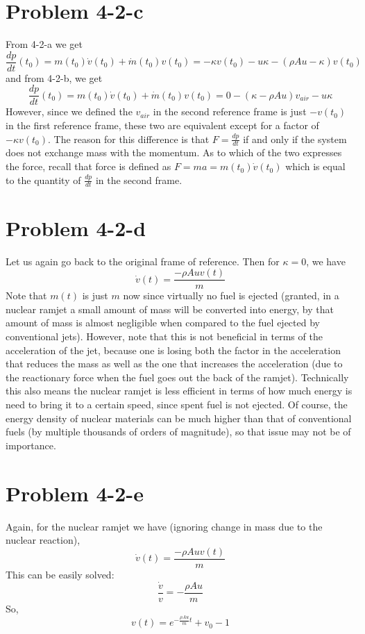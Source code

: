 \section*{Problem 4-2-c}
From 4-2-a we get 
\[ \frac{dp}{dt}(t_0) = m(t_0)\dot{v}(t_0) + \dot{m}(t_0)v(t_0)= -\kappa v(t_0) -u\kappa - (\rho A u -\kappa )v(t_0)\]
and from 4-2-b, we get 
\[ \frac{dp}{dt}(t_0) = m(t_0)\dot{v}(t_0) + \dot{m}(t_0)v(t_0)  = 0 -(\kappa - \rho A u)v_{air} -  u\kappa \]
However, since we defined the $v_{air}$ in the second reference frame is just $-v(t_0)$ in the first reference frame, these two are equivalent except for a factor of $-\kappa v(t_0)$. The reason for this difference is that $F=\frac{dp}{dt}$ if and only if the system does not exchange  mass with the momentum. As to which of the two expresses the force, recall that force is defined as $F=ma=m(t_0)\dot{v}(t_0)$ which is equal to the quantity of $\frac{dp}{dt}$ in the second frame.
\section*{Problem 4-2-d}
Let us again go back to the original frame of reference. Then for $\kappa=0$, we have 
\[ \dot{v}(t) = \frac{-\rho A u v(t)}{m} \]
Note that $m(t)$ is just $m$ now since virtually no fuel is ejected (granted, in a nuclear ramjet a small amount of mass will be converted into energy, by that amount of mass is almost negligible when compared to the fuel ejected by conventional jets). However, note that this is not beneficial in terms of the acceleration of the jet, because one is losing both the factor in the acceleration that reduces the mass as well as the one that increases the acceleration (due to the reactionary force when the fuel goes out the back of the ramjet). Technically this also means the nuclear ramjet is less efficient in terms of how much energy is need to bring it to a certain speed, since spent fuel is not ejected. Of course, the energy density of nuclear materials can be much higher than that of conventional fuels (by multiple thousands of orders of magnitude), so that issue may not be of importance.
\section*{Problem 4-2-e}
Again, for the nuclear ramjet we have (ignoring change in mass due to the nuclear reaction),
\[ \dot{v}(t) = \frac{-\rho A u v(t)}{m} \]
This can be easily solved:
\[ \frac{\dot{v}}{v} = -\frac{\rho A u}{m} \]
So,
\[ v(t) = e^{-\frac{\rho A u}{m} t} + v_0 - 1 \]
